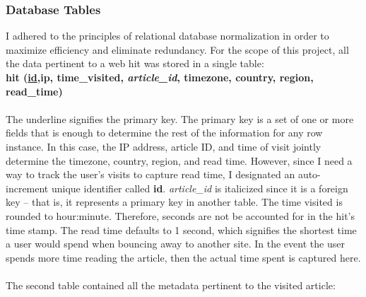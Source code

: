 \documentclass[12pt]{article}
\begin{document}
\subsubsection{Database Tables} 
I adhered to the principles of relational database normalization in order to maximize efficiency and eliminate redundancy. For the scope of this project, all the data pertinent to a web hit was stored in a single table: \\ 
{\textbf{hit (\underline{id},ip, time\_visited, \textit{article\_id}, timezone, country, region, read\_time)}} \\ \\
The underline signifies the primary key. The primary key is a set of one or more fields that is enough to determine the rest of the information for any row instance. In this case, the IP address, article ID, and time of visit jointly determine the timezone, country, region, and read time. However, since I need a way to track the user's visits to capture read time, I designated an auto-increment unique identifier called \textbf{id}. \textit{article\_id} is italicized since it is a foreign key -- that is, it represents a primary key in another table. The time visited is rounded to hour:minute. Therefore, seconds are not be accounted for in the hit's time stamp. The read time defaults to 1 second, which signifies the shortest time a user would spend when bouncing away to another site. In the event the user spends more time reading the article, then the actual time spent is captured here.
\\ \\
The second table contained all the metadata pertinent to the visited article:\\
\end{document}
